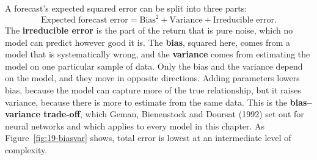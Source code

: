 A forecast's expected squared error can be split into three parts:
\begin{equation}
  \text{Expected forecast error} = \text{Bias}^2 + \text{Variance} + \text{Irreducible error}.
  \label{eq:19-biasvar}
\end{equation}
The \textbf{irreducible error} is the part of the return that is pure noise, which no model can predict however good it is. The \textbf{bias}, squared here, comes from a model that is systematically wrong, and the \textbf{variance} comes from estimating the model on one particular sample of data. Only the bias and the variance depend on the model, and they move in opposite directions. Adding parameters lowers bias, because the model can capture more of the true relationship, but it raises variance, because there is more to estimate from the same data. This is the \textbf{bias--variance trade-off}, which Geman, Bienenstock and Doursat (1992) set out for neural networks and which applies to every model in this chapter. As Figure~\ref{fig:19-biasvar} shows, total error is lowest at an intermediate level of complexity.




